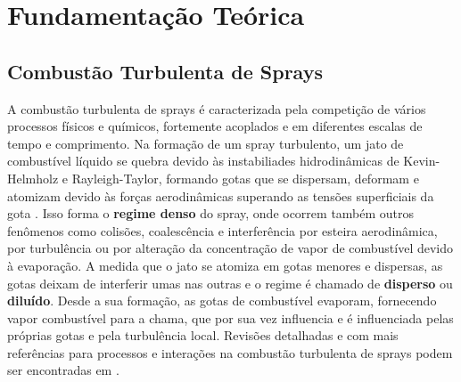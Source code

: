 

\section{Fundamentação Teórica}



\subsection{Combustão Turbulenta de Sprays} \label{sec:teoria}

A combustão turbulenta de sprays é caracterizada pela competição de vários processos físicos e químicos, fortemente acoplados e em diferentes escalas de tempo e comprimento. 
Na formação de um spray turbulento, um jato de combustível líquido se quebra devido às instabiliades hidrodinâmicas de Kevin-Helmholz e Rayleigh-Taylor, formando gotas que se dispersam, deformam e atomizam devido às forças aerodinâmicas superando as tensões superficiais da gota \cite{JennyB2012}.
Isso forma o \textbf{regime denso} do spray, onde ocorrem também outros fenômenos como colisões, coalescência e interferência por esteira aerodinâmica, por turbulência ou por alteração da concentração de vapor de combustível devido à evaporação.
A medida que o jato se atomiza em gotas menores e dispersas, as gotas deixam de interferir umas nas outras e o regime é chamado de \textbf{disperso} ou \textbf{diluído}. 
Desde a sua formação, as gotas de combustível evaporam, fornecendo vapor combustível para a chama, que por sua vez influencia e é influenciada pelas próprias gotas e pela turbulência local.
Revisões detalhadas e com mais referências para processos e interações na combustão turbulenta de sprays podem ser encontradas em \cite{JennyB2012, MasriA2016, SanchezA2015, ZhouL2021} .

